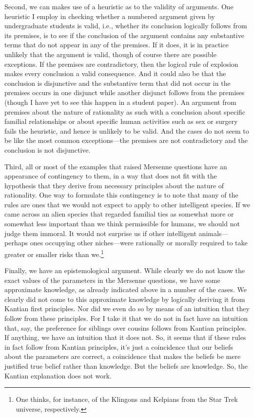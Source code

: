 Second, we can makes use of a heuristic as to the validity of arguments. One heuristic I employ in checking whether a numbered argument 
given by undergraduate students is valid, i.e., whether its conclusion logically follows from its premises, is to see if the conclusion of the
argument contains any substantive terms that do not appear in any of the premises. If it does, it is in practice unlikely that the 
argument is valid, though of course there are possible exceptions. If the premises are contradictory, then the logical
rule of explosion makes every conclusion a valid consequence. And it could also be that the conclusion is disjunctive and the
substantive term that did not occur in the premises occurs in one disjunct while another disjunct follows from the premises (though 
I have yet to see this happen in a student paper).  An argument from premises about the nature of rationality as such
with a conclusion about specific familial relationships or about specific human activities such as sex or surgery fails the heuristic,
and hence is unlikely to be valid. And the cases do not seem to be like the most common exceptions---the premises are not contradictory
and the conclusion is not disjunctive.

Third, all or most of the examples that raised Mersenne questions have an appearance of contingency to them, in a way that does not
fit with the hypothesis that they derive from necessary principles about the nature of rationality. One way to formulate this
contingency is to note that many of the rules are ones that we would not expect to apply to other intelligent species. If we
came across an alien species that regarded familial ties as somewhat more or somewhat less important than we think permissible
for humans, we should not judge them immoral. It would not surprise us if other intelligent animals---perhaps ones occupying
other niches---were rationally or morally required to take greater or smaller risks than we.\footnote{One thinks, for instance,
of the Klingons and Kelpians from the Star Trek universe, respectively.}

Finally, we have an epistemological argument. While clearly we do not know the exact values of the parameters in the Mersenne
questions, we have some approximate knowledge, as already indicated above in a number of the cases. We clearly did not come
to this approximate knowledge by logically deriving it from Kantian first principles. Nor did we even do so by means of an
intuition that they follow from these principles. For I take it that we do not in fact have an intuition that, say, the
preference for siblings over cousins follows from Kantian principles. If anything, we have an intuition that it does not.
So, it seems that if these rules in fact follow from Kantian principles, it's just a coincidence that our beliefs about
the parameters are correct, a coincidence that makes the beliefs be mere justified true belief rather than
knowledge. But the beliefs are knowledge. So, the Kantian explanation does not work. 

